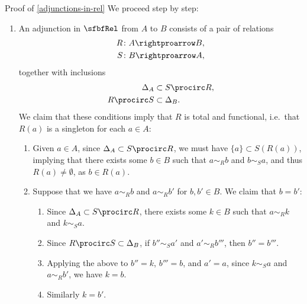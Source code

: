 \begin{Proof}{Proof of \cref{adjunctions-in-rel}}%
    We proceed step by step:
    \begin{enumerate}
        \item\label{proof-of-adjunctions-in-rel-1}An adjunction in $\sfbfRel$ from $A$ to $B$ consists of a pair of relations
            \begin{align*}
                R &\colon A\rightproarrow B,\\
                S &\colon B\rightproarrow A,
            \end{align*}
            together with inclusions
            \begin{align*}
                \Delta_{A}  &\subset S\procirc R,\\
                R\procirc S &\subset \Delta_{B}.
            \end{align*}
            We claim that these conditions imply that $R$ is total and functional, i.e.\ that $R(a)$ is a singleton for each $a\in A$:
            \begin{enumerate}
                \item\label{proof-of-adjunctions-in-rel-1a}Given $a\in A$, since $\Delta_{A}\subset S\procirc R$, we must have $\{a\}\subset S(R(a))$, implying that there exists some $b\in B$ such that $a\sim_{R}b$ and $b\sim_{S}a$, and thus $R(a)\neq\emptyset$, as $b\in R(a)$.
                \item\label{proof-of-adjunctions-in-rel-1b}Suppose that we have $a\sim_{R}b$ and $a\sim_{R}b'$ for $b,b'\in B$. We claim that $b=b'$:
                    \begin{enumerate}
                        \item\label{proof-of-adjunctions-in-rel-1bi}Since $\Delta_{A}\subset S\procirc R$, there exists some $k\in B$ such that $a\sim_{R}k$ and $k\sim_{S}a$.
                        \item\label{proof-of-adjunctions-in-rel-1bii}Since $R\procirc S\subset\Delta_{B}$, if $b''\sim_{S}a'$ and $a'\sim_{R}b'''$, then $b''=b'''$.
                        \item\label{proof-of-adjunctions-in-rel-1biii}Applying the above to $b''=k$, $b'''=b$, and $a'=a$, since $k\sim_{S}a$ and $a\sim_{R}b'$, we have $k=b$.
                        \item\label{proof-of-adjunctions-in-rel-1biv}Similarly $k=b'$.

\end{enumerate}
\end{enumerate}
\end{enumerate}
\end{Proof}
